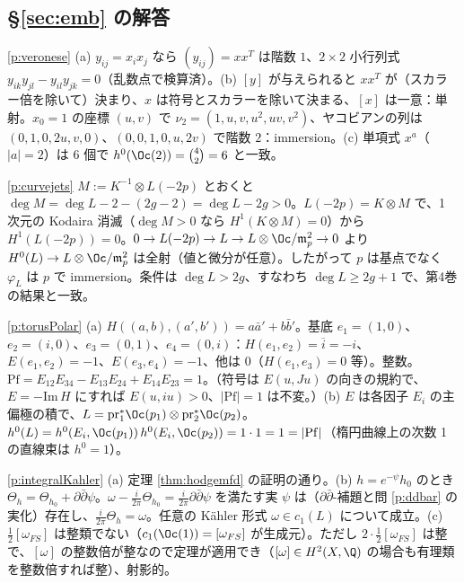 \subsection*{\S\ref{sec:emb} の解答}
\begin{sol}{\ref{p:veronese}}
(a) $y_{ij}=x_ix_j$ なら $(y_{ij})=xx^T$ は階数 $1$、$2\times2$ 小行列式 $y_{ik}y_{jl}-y_{il}y_{jk}=0$（乱数点で検算済）。(b) $[y]$ が与えられると $xx^T$ が（スカラー倍を除いて）決まり、$x$ は符号とスカラーを除いて決まる、$[x]$ は一意：単射。$x_0=1$ の座標 $(u,v)$ で $\nu_2=(1,u,v,u^2,uv,v^2)$、ヤコビアンの列は $(0,1,0,2u,v,0)$、$(0,0,1,0,u,2v)$ で階数 $2$：immersion。(c) 単項式 $x^a$（$|a|=2$）は $6$ 個で $h^0(\Oc(2))=\binom42=6$ と一致。
\end{sol}
\begin{sol}{\ref{p:curvejets}}
$M:=K^{-1}\otimes L(-2p)$ とおくと $\deg M=\deg L-2-(2g-2)=\deg L-2g>0$。$L(-2p)=K\otimes M$ で、1 次元の Kodaira 消滅（$\deg M>0$ なら $H^1(K\otimes M)=0$）から $H^1(L(-2p))=0$。$0\to L(-2p)\to L\to L\otimes\Oc/\mathfrak m_p^2\to0$ より $H^0(L)\to L\otimes\Oc/\mathfrak m_p^2$ は全射（値と微分が任意）。したがって $p$ は基点でなく $\varphi_L$ は $p$ で immersion。条件は $\deg L>2g$、すなわち $\deg L\ge2g+1$ で、第4巻の結果と一致。
\end{sol}
\begin{sol}{\ref{p:torusPolar}}
(a) $H((a,b),(a',b'))=a\bar a'+b\bar b'$。基底 $e_1=(1,0)$、$e_2=(i,0)$、$e_3=(0,1)$、$e_4=(0,i)$：$H(e_1,e_2)=\overline{i}=-i$、$E(e_1,e_2)=-1$、$E(e_3,e_4)=-1$、他は $0$（$H(e_1,e_3)=0$ 等）。整数。$\mathrm{Pf}=E_{12}E_{34}-E_{13}E_{24}+E_{14}E_{23}=1$。（符号は $E(u,Ju)$ の向きの規約で、$E=-\mathrm{Im}\,H$ にすれば $E(u,iu)>0$、$|\mathrm{Pf}|=1$ は不変。）(b) $E$ は各因子 $E_i$ の主偏極の積で、$L=\mathrm{pr}_1^*\Oc(p_1)\otimes\mathrm{pr}_2^*\Oc(p_2)$。$h^0(L)=h^0(E_i,\Oc(p_1))\,h^0(E_i,\Oc(p_2))=1\cdot1=1=|\mathrm{Pf}|$（楕円曲線上の次数 1 の直線束は $h^0=1$）。
\end{sol}
\begin{sol}{\ref{p:integralKahler}}
(a) 定理 \ref{thm:hodgemfd} の証明の通り。(b) $h=e^{-\psi}h_0$ のとき $\Theta_h=\Theta_{h_0}+\partial\bar\partial\psi$。$\omega-\frac i{2\pi}\Theta_{h_0}=\frac i{2\pi}\partial\bar\partial\psi$ を満たす実 $\psi$ は（$\partial\bar\partial$-補題と問 \ref{p:ddbar} の実化）存在し、$\frac i{2\pi}\Theta_h=\omega$。任意の Kähler 形式 $\omega\in c_1(L)$ について成立。(c) $\frac12[\omega_{FS}]$ は整類でない（$c_1(\Oc(1))=[\omega_{FS}]$ が生成元）。ただし $2\cdot\frac12[\omega_{FS}]$ は整で、$[\omega]$ の整数倍が整なので定理が適用でき（$[\omega]\in H^2(X,\Q)$ の場合も有理類を整数倍すれば整）、射影的。
\end{sol}
